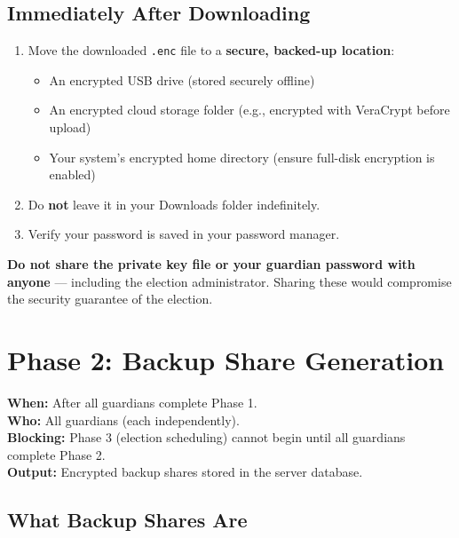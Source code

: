 \documentclass[12pt,a4paper]{book}
\begin{document}
\section{Immediately After Downloading}

\begin{enumerate}
  \item Move the downloaded \texttt{.enc} file to a \textbf{secure, backed-up location}:
  \begin{itemize}
    \item An encrypted USB drive (stored securely offline)
    \item An encrypted cloud storage folder (e.g., encrypted with VeraCrypt before upload)
    \item Your system's encrypted home directory (ensure full-disk encryption is enabled)
  \end{itemize}
  \item Do \textbf{not} leave it in your Downloads folder indefinitely.
  \item Verify your password is saved in your password manager.
\end{enumerate}

\begin{tcolorbox}[warnbox]
\textbf{Do not share the private key file or your guardian password with anyone} --- including the election administrator. Sharing these would compromise the security guarantee of the election.
\end{tcolorbox}

\chapter{Phase 2: Backup Share Generation}
\label{ch:guard-phase2}

\begin{tcolorbox}[phasebox,title={Phase 2: Backup Share Generation}]
\textbf{When:} After all guardians complete Phase 1.\\
\textbf{Who:} All guardians (each independently).\\
\textbf{Blocking:} Phase 3 (election scheduling) cannot begin until all guardians complete Phase 2.\\
\textbf{Output:} Encrypted backup shares stored in the server database.
\end{tcolorbox}

\section{What Backup Shares Are}
\end{document}
